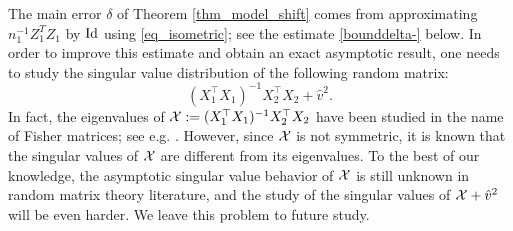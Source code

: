 The main error $\delta$ of Theorem \ref{thm_model_shift} comes from approximating $n_1^{-1}Z_1^TZ_1$ by $\id$ using \eqref{eq_isometric}; see the estimate \eqref{bounddelta-} below. In order to improve this estimate and obtain an exact asymptotic result, one needs to study the singular value distribution of the following random matrix:
$$(X_1^{\top}X_1)^{-1}X_2^{\top}X_2 +  \hat{v}^2 .$$
In fact, the eigenvalues of $\cal X:=(X_1^{\top}X_1)^{-1}X_2^{\top}X_2$ have been studied in the name of Fisher matrices; see e.g. \cite{Fmatrix}. However, since $\cal X$ is not symmetric, it is known that the singular values of $\cal X$ are different from its eigenvalues. To the best of our knowledge, the asymptotic singular value behavior of $\cal X$ is still unknown in random matrix theory literature, and the study of the singular values of $\cal X +\hat v^2$ will be even harder. We leave this problem to future study.





